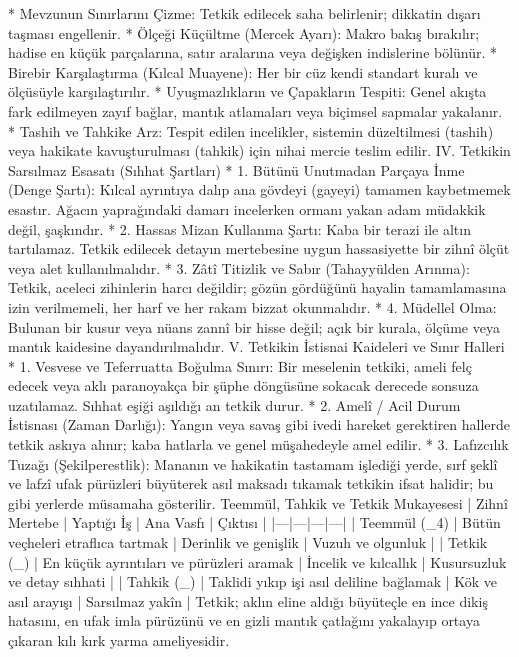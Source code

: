 \documentclass[11pt,a4paper]{article}
\begin{document}
 * Mevzunun Sınırlarını Çizme: Tetkik edilecek saha belirlenir; dikkatin dışarı taşması engellenir.
 * Ölçeği Küçültme (Mercek Ayarı): Makro bakış bırakılır; hadise en küçük parçalarına, satır aralarına veya değişken indislerine bölünür.
 * Birebir Karşılaştırma (Kılcal Muayene): Her bir cüz kendi standart kuralı ve ölçüsüyle karşılaştırılır.
 * Uyuşmazlıkların ve Çapakların Tespiti: Genel akışta fark edilmeyen zayıf bağlar, mantık atlamaları veya biçimsel sapmalar yakalanır.
 * Tashih ve Tahkike Arz: Tespit edilen incelikler, sistemin düzeltilmesi (tashih) veya hakikate kavuşturulması (tahkik) için nihai mercie teslim edilir.
IV. Tetkikin Sarsılmaz Esasatı (Sıhhat Şartları)
 * 1. Bütünü Unutmadan Parçaya İnme (Denge Şartı):
   Kılcal ayrıntıya dalıp ana gövdeyi (gayeyi) tamamen kaybetmemek esastır. Ağacın yaprağındaki damarı incelerken ormanı yakan adam müdakkik değil, şaşkındır.
 * 2. Hassas Mizan Kullanma Şartı:
   Kaba bir terazi ile altın tartılamaz. Tetkik edilecek detayın mertebesine uygun hassasiyette bir zihnî ölçüt veya alet kullanılmalıdır.
 * 3. Zâtî Titizlik ve Sabır (Tahayyülden Arınma):
   Tetkik, aceleci zihinlerin harcı değildir; gözün gördüğünü hayalin tamamlamasına izin verilmemeli, her harf ve her rakam bizzat okunmalıdır.
 * 4. Müdellel Olma:
   Bulunan bir kusur veya nüans zannî bir hisse değil; açık bir kurala, ölçüme veya mantık kaidesine dayandırılmalıdır.
V. Tetkikin İstisnai Kaideleri ve Sınır Halleri
 * 1. Vesvese ve Teferruatta Boğulma Sınırı:
   Bir meselenin tetkiki, ameli felç edecek veya aklı paranoyakça bir şüphe döngüsüne sokacak derecede sonsuza uzatılamaz. Sıhhat eşiği aşıldığı an tetkik durur.
 * 2. Amelî / Acil Durum İstisnası (Zaman Darlığı):
   Yangın veya savaş gibi ivedi hareket gerektiren hallerde tetkik askıya alınır; kaba hatlarla ve genel müşahedeyle amel edilir.
 * 3. Lafızcılık Tuzağı (Şekilperestlik):
   Mananın ve hakikatin tastamam işlediği yerde, sırf şeklî ve lafzî ufak pürüzleri büyüterek asıl maksadı tıkamak tetkikin ifsat halidir; bu gibi yerlerde müsamaha gösterilir.
Teemmül, Tahkik ve Tetkik Mukayesesi
| Zihnî Mertebe | Yaptığı İş | Ana Vasfı | Çıktısı |
|---|---|---|---|
| Teemmül (_4) | Bütün veçheleri etraflıca tartmak | Derinlik ve genişlik | Vuzuh ve olgunluk |
| Tetkik (_{}) | En küçük ayrıntıları ve pürüzleri aramak | İncelik ve kılcallık | Kusursuzluk ve detay sıhhati |
| Tahkik (_{}) | Taklidi yıkıp işi asıl deliline bağlamak | Kök ve asıl arayışı | Sarsılmaz yakîn |
Tetkik; aklın eline aldığı büyüteçle en ince dikiş hatasını, en ufak imla pürüzünü ve en gizli mantık çatlağını yakalayıp ortaya çıkaran kılı kırk yarma ameliyesidir.
\end{document}
